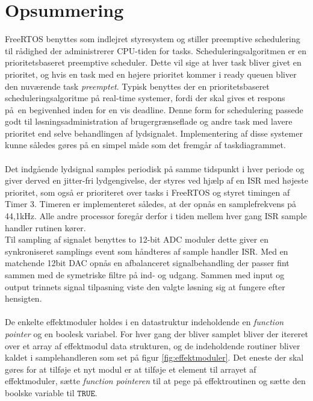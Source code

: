 \section{Opsummering}

FreeRTOS benyttes som indlejret styresystem og stiller preemptive schedulering til rådighed der administrerer CPU-tiden for tasks. 
Scheduleringsalgoritmen er en prioritetsbaseret preemptive scheduler.
Dette vil sige at hver task bliver givet en prioritet, og hvis en task med en højere prioritet kommer i ready queuen bliver den nuværende task \textit{preemptet}.
Typisk benyttes der en prioritetsbaseret scheduleringsalgoritme på real-time systemer, fordi der skal gives et respons på en begivenhed inden for en vis deadline.
Denne form for schedulering passede godt til løsningsadministration af brugergrænseflade og andre task med lavere prioritet end selve behandlingen af lydsignalet. 
Implementering af disse systemer kunne således gøres på en simpel måde som det fremgår af taskdiagrammet.
\\
\\
Det indgående lydsignal samples periodisk på samme tidspunkt i hver periode og giver derved en jitter-fri lydgengivelse, der
styres ved hjælp af en ISR med højeste prioritet, som også er prioriteret over tasks i FreeRTOS og styret timingen af Timer 3.
Timeren er implementeret således, at der opnås en samplefrekvens på 44,1kHz. 
Alle andre processor foregår derfor i tiden mellem hver gang ISR sample handler rutinen kører. 
\\
Til sampling af signalet benyttes to 12-bit ADC moduler dette giver en synkroniseret samplings event som håndteres af sample handler ISR.
Med en matchende 12bit DAC opnås en afbalanceret signalbehandling der passer fint sammen med de symetriske filtre på ind- og udgang.
Sammen med input og output trinnets signal tilpasning viste den valgte løsning sig at fungere efter hensigten.
\\
\\
De enkelte effektmoduler holdes i en datastruktur indeholdende en \textit{function pointer} og en boolesk variabel.
For hver gang der bliver samplet bliver der itereret over et array af effektmodul data strukturen, og de indeholdende routiner bliver kaldet i samplehandleren som set på figur \ref{fig:effektmoduler}.\newline
Det eneste der skal gøres for at tilføje et nyt modul er at tilføje et element til arrayet af effektmoduler, sætte \textit{function pointeren} til at pege på effektroutinen og sætte den boolske variable til $\mathtt{TRUE}$.
